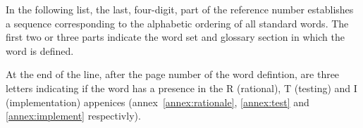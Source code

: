 
\label{annex:index}

In the following list, the last, four-digit, part of the reference
number establishes a sequence corresponding to the alphabetic ordering
of all standard words. The first two or three parts indicate the word
set and glossary section in which the word is defined.

At the end of the line, after the page number of the word defintion, are three
letters indicating if the word has a presence in the R (rational), T (testing) and
I (implementation) appenices (annex~\ref{annex:rationale}, \ref{annex:test}
and \ref{annex:implement} respectivly).

~\par
\makeatletter


\newcommand{\indexentry}{
	\@starfalse
	\@ifnextchar*{\alpha@star}{\alpha@entry}
}

\newcommand{\alpha@star}[1]{
	\@startrue
	\alpha@entry
}

\newlength{\alpha@length}
\ifshowref
	\setlength{\alpha@length}{0.2\textwidth}
\else
	\setlength{\alpha@length}{0.3\textwidth}
\fi

\newcommand{\alpha@annex}[4]{%
	\expandafter\ifx\csname r@#2:#3:#4\endcsname\relax\else%
		\gdef\alpha@letter{#1}%
		\expandafter\expandafter\expandafter\alpha@annex@inline\csname r@#2:#3:#4\endcsname%
	\fi%
}

\newcommand{\alpha@annex@inline}[4]{%
	\hyperref{}{}{#4}{\alpha@letter}%
}

